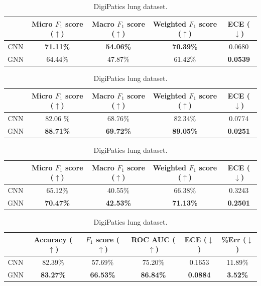 \begin{table}[ht]
\centering
\caption{Result of the GNN vs CNN experiment.}
\begin{tabular}{c|c|c|c|c|}
  \cline{2-5}
  & Micro $F_1$ score ($\uparrow$) & Macro $F_1$ score ($\uparrow$) & Weighted $F_1$ score ($\uparrow$) & ECE ($\downarrow$) \\ \hline
\multicolumn{1}{|c|}{CNN}  & \textbf{71.11\%} & \textbf{54.06\%} & \textbf{70.39\%} & 0.0680 \\ \hline
\multicolumn{1}{|c|}{GNN}  & 64.44\% & 47.87\% & 61.42\% & \textbf{0.0539} \\ \hline
\end{tabular}
\caption{CoNSeP dataset.}

\vspace{0.5cm}


\begin{tabular}{c|c|c|c|c|}
  \cline{2-5}
  & Micro $F_1$ score ($\uparrow$) & Macro $F_1$ score ($\uparrow$) & Weighted $F_1$ score ($\uparrow$) & ECE ($\downarrow$) \\ \hline
\multicolumn{1}{|c|}{CNN}  & 82.06 \% & 68.76\% & 82.34\% & 0.0774 \\ \hline
\multicolumn{1}{|c|}{GNN}  & \textbf{88.71\%} & \textbf{69.72\%} & \textbf{89.05\%} & \textbf{0.0251}  \\ \hline
\end{tabular}
\caption{MoNuSAC dataset.}

\vspace{0.5cm}

\begin{tabular}{c|c|c|c|c|}
  \cline{2-5}
  & Micro $F_1$ score ($\uparrow$) & Macro $F_1$ score ($\uparrow$) & Weighted $F_1$ score ($\uparrow$) & ECE ($\downarrow$) \\ \hline
\multicolumn{1}{|c|}{CNN}  & 65.12\% & 40.55\% & 66.38\% & 0.3243 \\ \hline
\multicolumn{1}{|c|}{GNN}  & \textbf{70.47\%} & \textbf{42.53\%} & \textbf{71.13\%} & \textbf{0.2501} \\ \hline
\end{tabular}
\caption{DigiPatics breast dataset.}

\vspace{0.5cm}

\begin{tabular}{c|c|c|c|c|c|}
  \cline{2-6}
  & Accuracy ($\uparrow$) & $F_1$ score ($\uparrow$) & ROC AUC ($\uparrow$) & ECE ($\downarrow$) & \%Err ($\downarrow$) \\ \hline
\multicolumn{1}{|c|}{CNN}  & 82.39\% & 57.69\% & 75.20\% & 0.1653 & 11.89\% \\ \hline
\multicolumn{1}{|c|}{GNN}  & \textbf{83.27\%} & \textbf{66.53\%} & \textbf{86.84\%} & \textbf{0.0884} & \textbf{3.52\%} \\ \hline
\end{tabular}
\caption{DigiPatics lung dataset.}
\label{tab:gnn-cnn}
\end{table}

